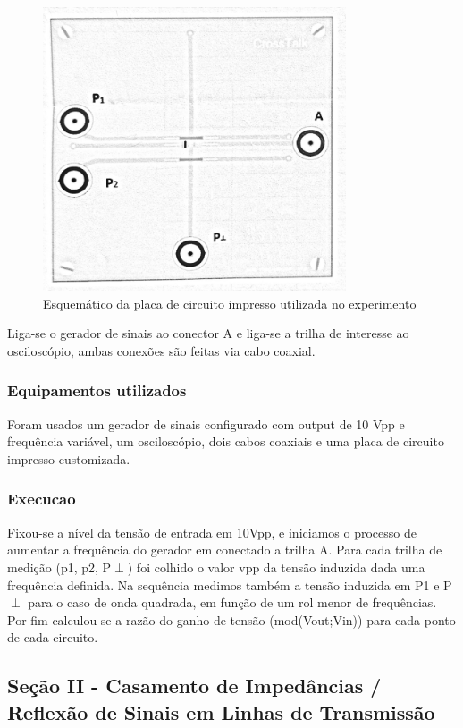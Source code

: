 \documentclass[12pt]{article}
\begin{document}
\begin{figure}[H]
  \centering
  \includegraphics[width=0.8\textwidth]{img/pcb-esquema.png}
  \caption{Esquemático da placa de circuito impresso utilizada no experimento}
  \label{fig:img/pcb-esquema.png}
\end{figure}

Liga-se o gerador de sinais ao conector A e liga-se a trilha de
interesse ao osciloscópio, ambas conexões são feitas via cabo coaxial.

\subsubsection{Equipamentos utilizados}
Foram usados um gerador de sinais configurado com output de 10 Vpp e
frequência variável, um osciloscópio, dois cabos coaxiais e uma placa
de circuito impresso customizada.

\subsubsection{Execucao}
Fixou-se a nível da tensão de entrada em 10Vpp, e iniciamos o
processo de aumentar a frequência do gerador em conectado a trilha A.
Para cada trilha de medição (p1, p2, P$\perp$) foi colhido o valor
vpp da tensão induzida dada uma frequência definida.
Na sequência medimos também a tensão induzida em P1 e P$\perp$ para o
caso de onda quadrada, em função de um rol menor de frequências.
Por fim calculou-se a razão do ganho de tensão (mod(Vout;Vin)) para
cada ponto de cada circuito.

\subsection{Seção II - Casamento de Impedâncias / Reflexão de Sinais
em Linhas de Transmissão}
\end{document}
